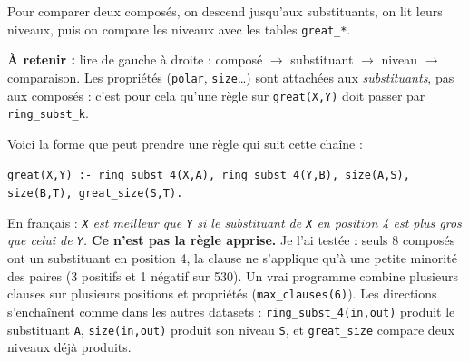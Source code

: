 \documentclass[10pt]{article}
\newcommand{\ce}[1]{\begin{pourquoi}\textbf{\textcolor{marine}{À retenir :}} #1\end{pourquoi}}
\newcommand{\st}[1]{\par\needspace{7\baselineskip}\vspace{5pt}{\normalsize\bfseries\textcolor{marine}{#1}}\par\vspace{2pt}}
\begin{document}
\st{Comment ces concepts s'enchaînent}
Pour comparer deux composés, on descend jusqu'aux substituants, on lit leurs niveaux, puis on compare les niveaux avec les tables \texttt{great\_*}.
\begin{center}
\end{center}
\ce{lire de gauche à droite : composé $\to$ substituant $\to$ niveau $\to$ comparaison. Les propriétés (\texttt{polar}, \texttt{size}\ldots) sont attachées aux \emph{substituants}, pas aux composés : c'est pour cela qu'une règle sur \texttt{great(X,Y)} doit passer par \texttt{ring\_subst\_k}.}

\st{Une clause possible (illustration seulement)}
Voici la forme que peut prendre une règle qui suit cette chaîne :
\begin{moi}
\texttt{great(X,Y) :- ring\_subst\_4(X,A), ring\_subst\_4(Y,B), size(A,S), size(B,T), great\_size(S,T).}
\end{moi}
En français : \emph{\texttt{X} est meilleur que \texttt{Y} si le substituant de \texttt{X} en position 4 est plus gros que celui de \texttt{Y}.}
\textbf{Ce n'est pas la règle apprise.} Je l'ai testée : seuls 8 composés ont un substituant en position 4, la clause ne s'applique qu'à une petite minorité des paires (3 positifs et 1 négatif sur 530). Un vrai programme combine plusieurs clauses sur plusieurs positions et propriétés (\texttt{max\_clauses(6)}).
Les directions s'enchaînent comme dans les autres datasets : \texttt{ring\_subst\_4(in,out)} produit le substituant \texttt{A}, \texttt{size(in,out)} produit son niveau \texttt{S}, et \texttt{great\_size} compare deux niveaux déjà produits.
\end{document}
